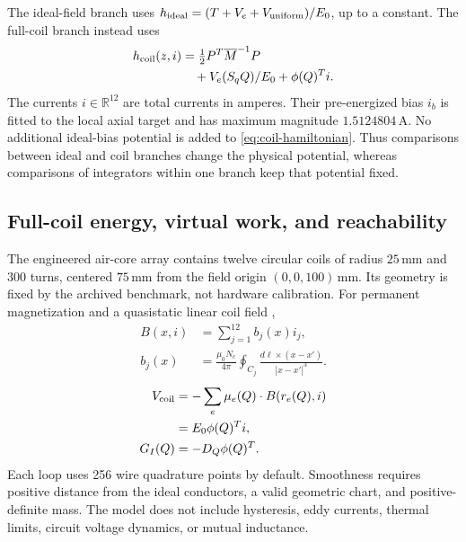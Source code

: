 The ideal-field branch uses $h_{\rm ideal}=(T+V_e+V_{\rm uniform})/E_0$, up to a constant. The full-coil branch instead uses
\begin{equation}
\begin{aligned}
 h_{\rm coil}(z,i)&=\tfrac12P^T\overline M^{-1}P\\
 &\quad+V_e(S_qQ)/E_0+\phi(Q)^Ti.
\end{aligned}
 \label{eq:coil-hamiltonian}
\end{equation}
The currents $i\in\mathbb R^{12}$ are total currents in amperes. Their pre-energized bias $i_b$ is fitted to the local axial target and has maximum magnitude $1.5124804$\,A. No additional ideal-bias potential is added to \eqref{eq:coil-hamiltonian}. Thus comparisons between ideal and coil branches change the physical potential, whereas comparisons of integrators within one branch keep that potential fixed.

\subsection{Full-coil energy, virtual work, and reachability}
The engineered air-core array contains twelve circular coils of radius $25$\,mm and 300 turns, centered $75$\,mm from the field origin $(0,0,100)$\,mm. Its geometry is fixed by the archived benchmark, not hardware calibration. For permanent magnetization and a quasistatic linear coil field \citep{Abbott2020},
\begin{equation}
\begin{aligned}
 B(x,i)&=\sum_{j=1}^{12}b_j(x)i_j,\\
 b_j(x)&=\frac{\mu_0N_c}{4\pi}\oint_{C_j}
 \frac{d\ell\times(x-x')}{|x-x'|^3}.
\end{aligned}
 \label{eq:coil-field}
\end{equation}
\begin{equation}
\begin{aligned}
 V_{\rm coil}&=-\sum_e\mu_e(Q)\cdot B(r_e(Q),i)\\
 &=E_0\phi(Q)^Ti,\\
 G_I(Q)&=-D_Q\phi(Q)^T.
\end{aligned}
 \label{eq:current-port}
\end{equation}
Each loop uses 256 wire quadrature points by default. Smoothness requires positive distance from the ideal conductors, a valid geometric chart, and positive-definite mass. The model does not include hysteresis, eddy currents, thermal limits, circuit voltage dynamics, or mutual inductance.

